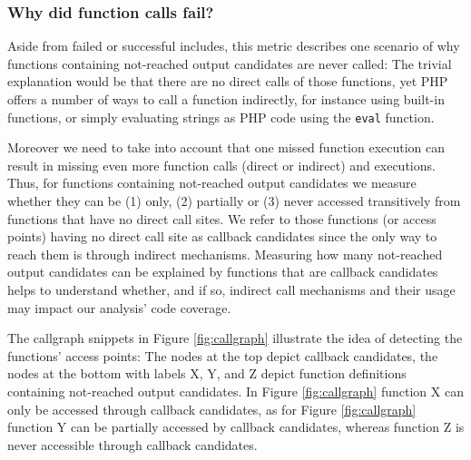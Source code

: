 \documentclass[sigconf]{acmart}
\begin{document}
\subsubsection{Why did function calls fail?}
\label{WhyDidFunctionCallsFail}
Aside from failed or successful includes, this metric describes one scenario of
why functions containing not-reached output candidates are never called: The
trivial explanation would be that there are no direct calls of those functions,
yet PHP offers a number of ways to call a function indirectly, for instance
using built-in functions, or simply evaluating strings as PHP code using the
\texttt{eval} function.

Moreover we need to take into account that one missed function execution can
result in missing even more function calls (direct or indirect) and executions.
Thus, for functions containing not-reached output candidates we measure whether
they can be (1) only, (2) partially or (3) never accessed transitively from
functions that have no direct call sites. We refer to those functions (or
access points) having no direct call site as callback candidates since the only
way to reach them is through indirect mechanisms. Measuring how many
not-reached output candidates can be explained by functions that are callback
candidates helps to understand whether, and if so, indirect call mechanisms and
their usage may impact our analysis’ code coverage.

The callgraph snippets in Figure \ref{fig:callgraph} illustrate the idea of
detecting the functions’ access points: The nodes at the top depict callback
candidates, the nodes at the bottom with labels X, Y, and Z depict function
definitions containing not-reached output candidates. In Figure
\ref{fig:callgraph} function X can only be accessed through callback
candidates, as for Figure \ref{fig:callgraph} function Y can be partially
accessed by callback candidates, whereas function Z is never accessible through
callback candidates.
\end{document}
